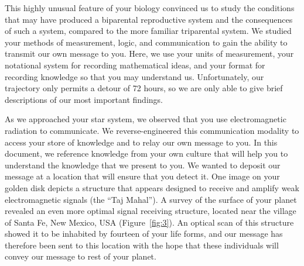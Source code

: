 This highly unusual feature of your biology convinced us to study the conditions that may have produced a biparental reproductive system and the consequences of such a system, compared to the more familiar triparental system. We studied your methods of measurement, logic, and communication to gain the ability to transmit our own message to you. Here, we use your units of measurement, your notational system for recording mathematical ideas, and your format for recording knowledge so that you may understand us. Unfortunately, our trajectory only permits a detour of 72 hours, so we are only able to give brief descriptions of our most important findings. 

As we approached your star system, we observed that you use electromagnetic radiation to communicate. We reverse-engineered this communication modality to access your store of knowledge and to relay our own message to you. In this document, we reference knowledge from your own culture that will help you to understand the knowledge that we present to you. We wanted to deposit our message at a location that will ensure that you detect it. One image on your golden disk depicts a structure that appears designed to receive and amplify weak electromagnetic signals (the ``Taj Mahal''). A survey of the surface of your planet revealed an even more optimal signal receiving structure, located near the village of Santa Fe, New Mexico, USA (Figure~\ref{fig:3}). An optical scan of this structure showed it to be inhabited by fourteen of your life forms, and our message has therefore been sent to this location with the hope that these individuals will convey our message to rest of your planet. 



